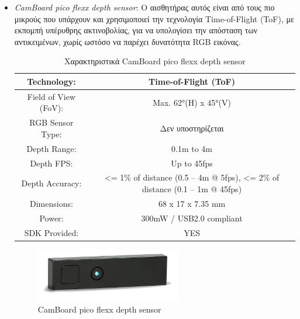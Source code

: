 \begin{itemize}
    \item \emph{CamBoard pico flexx depth sensor}: Ο αισθητήρας αυτός είναι από τους πιο μικρούς που υπάρχουν και χρησιμοποιεί την τεχνολογία Time-of-Flight (ToF), με εκπομπή υπέρυθρης ακτινοβολίας, για να υπολογίσει την απόσταση των αντικειμένων, χωρίς ωστόσο να παρέχει δυνατότητα RGB εικόνας.
    \begin{table}[H]
    \centering
    \begin{tabular}{|c|c|}
        \hline
        Technology: & Time-of-Flight (ToF)\\
        \hline
        Field of View (FoV): & Max. 62°(H) x 45°(V)\\
        \hline
        RGB Sensor Type: & Δεν υποστηρίζεται\\
        \hline
        Depth Range: & 0.1m to 4m\\
        \hline
        Depth FPS: & Up to 45fps\\
        \hline
        Depth Accuracy: & <= 1\% of distance (0.5 – 4m @ 5fps), <= 2\% of distance (0.1 – 1m @ 45fps)\\
        \hline
        Dimensions: & 68 x 17 x 7.35 mm\\ 
        \hline
        Power: & 300mW / USB2.0 compliant\\
        \hline
        SDK Provided: & YES\\
        \hline
    \end{tabular}
    \caption{Χαρακτηριστικά CamBoard pico flexx depth sensor \cite{CamBoard10:online}}
    \label{tab:pico}
    \end{table}
    \begin{figure}[H]
        \centering
        \includegraphics[width=0.6\textwidth]{images/pico_flexx.png}
        \caption{CamBoard pico flexx depth sensor}
        \label{fig:pico}
    \end{figure}
\end{itemize}

